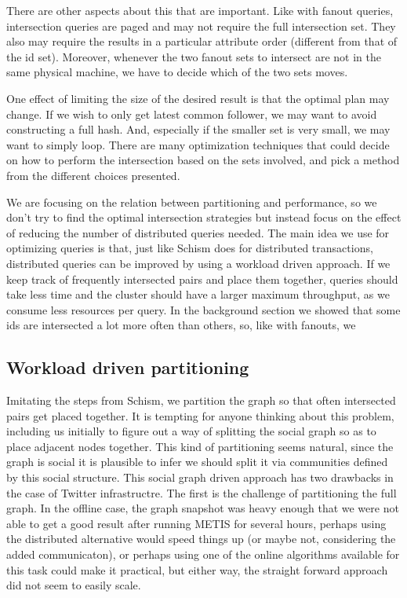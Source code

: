 There are other aspects about this that are important. Like with fanout queries, intersection queries are paged and may not require the full intersection set. They also may require the results in a particular attribute order (different from that of the id set). Moreover, whenever the two fanout sets to intersect are not in the same physical machine, we have to decide which of the two sets moves. 

One effect of limiting the size of the desired result is that the optimal plan may change. If we wish to only get latest common follower, we may want to avoid constructing a full hash. And, especially if the smaller set is very small, we may want to simply loop. There are many optimization techniques that could decide on how to perform the intersection based on the sets involved, and pick a method from the different choices presented.

We are focusing on the relation between partitioning and performance, so we don't try to find  the optimal intersection strategies but instead focus on the effect of reducing the number of distributed queries needed. The main idea we use for optimizing queries is that, just like Schism does for distributed transactions, distributed queries can be improved by using a workload driven approach. If we keep track of frequently intersected pairs and place them together, queries should take less time and the cluster should have a larger maximum throughput, as we consume less resources per query. In the background section we showed that some ids are  intersected a lot more often than others, so, like with fanouts, we

\subsection{Workload driven partitioning}
Imitating the steps from Schism, we partition the graph so that often intersected pairs get placed together. It is tempting for anyone thinking about this problem, including us initially to figure out a way of splitting the social graph  so as to place adjacent nodes together. This kind of partitioning seems natural, since the graph is social it is plausible to infer we should split it via communities  defined by this social structure.  This social graph driven approach has two drawbacks in the case of Twitter infrastructre. The first is the challenge of partitioning the full graph. In the offline case, the graph snapshot was heavy enough that we were not able to get a good result after running METIS for several hours, perhaps using the distributed alternative would speed things up (or maybe not, considering the added communicaton), or perhaps using one of the online algorithms available for this task could make it practical, but either way, the straight forward  approach did not seem to easily scale.   

